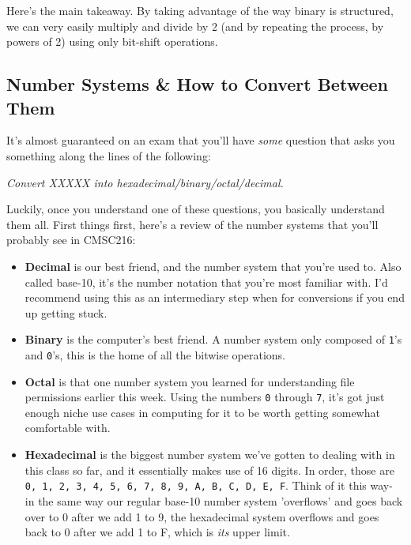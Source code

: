 \documentclass[english, 10pt]{article}
\begin{document}
Here's the main takeaway. By taking advantage of the way binary is structured, we can very easily multiply and divide by 2 (and by repeating the process, by powers of 2) using only bit-shift operations.

\subsection{Number Systems \& How to Convert Between Them}

It's almost guaranteed on an exam that you'll have \textit{some} question that asks you something along the lines of the following:\newline

\textit{Convert XXXXX into hexadecimal/binary/octal/decimal.}\newline

Luckily, once you understand one of these questions, you basically understand them all. First things first, here's a review of the number systems that you'll probably see in CMSC216:\newline

\begin{itemize}
	\item \textbf{Decimal} is our best friend, and the number system that you're used to. Also called base-10, it's the number notation that you're most familiar with. I'd recommend using this as an intermediary step when for conversions if you end up getting stuck.
	\item \textbf{Binary} is the computer's best friend. A number system only composed of \texttt{1}'s and \texttt{0}'s, this is the home of all the bitwise operations.
	\item \textbf{Octal} is that one number system you learned for understanding file permissions earlier this week. Using the numbers \texttt{0} through \texttt{7}, it's got just enough niche use cases in computing for it to be worth getting somewhat comfortable with.
	\item \textbf{Hexadecimal} is the biggest number system we've gotten to dealing with in this class so far, and it essentially makes use of 16 digits. In order, those are \texttt{0, 1, 2, 3, 4, 5, 6, 7, 8, 9, A, B, C, D, E, F}. Think of it this way- in the same way our regular base-10 number system 'overflows' and goes back over to 0 after we add 1 to 9, the hexadecimal system overflows and goes back to 0 after we add 1 to F, which is \textit{its} upper limit.
\end{itemize}
\end{document}
